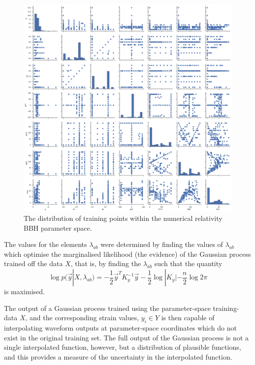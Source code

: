\documentclass[a4paper]{article}
\begin{document}
\begin{figure}
  \centering
  \includegraphics[width=\textwidth]{parameters.pdf}
  \caption{The distribution of training points within the numerical relativity BBH parameter space.}
  \label{fig:parameterspace}
\end{figure}

The values for the elements $\lambda_{ab}$ were determined by finding
the values of $\lambda_{ab}$ which optimise the marginalised
likelihood (the evidence) of the Gaussian process trained off the data
$X$, that is, by finding the $\lambda_{ab}$ such that the quantity
\begin{equation}
  \label{eq:evidence}
  \log p(\vec{y} | X, \lambda_{ab}) = - \frac{1}{2} \vec{y}^T K_y^{-1} \vec{y} - \frac{1}{2} \log|K_y| - \frac{n}{2} \log 2 \pi
\end{equation}
is maximised.


The output of a Gaussian process trained using the parameter-space
training-data $X$, and the corresponding strain values, $y_i \in Y$ is
then capable of interpolating waveform outputs at parameter-space
coordinates which do not exist in the original training set. The full
output of the Gaussian process is not a single interpolated function,
however, but a distribution of plausible functions, and this provides
a measure of the uncertainty in the interpolated function.
\end{document}
